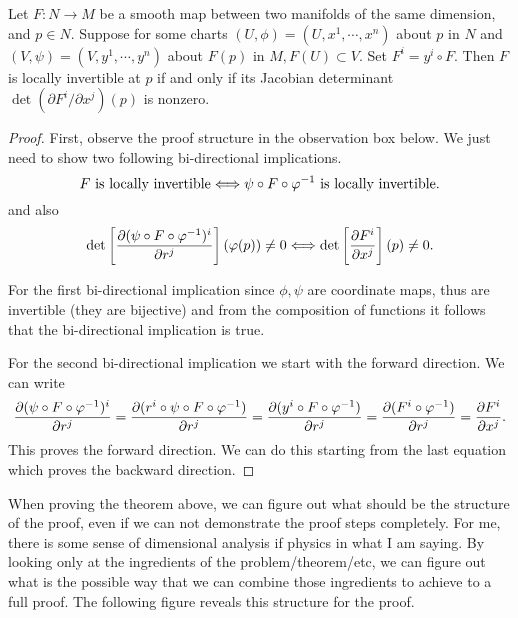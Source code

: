 \begin{definition}
	Let $ F: N \to M $ be a smooth map between two manifolds of the same dimension, and $ p \in N $. Suppose for some charts $ (U,\phi) = (U,x^1,\cdots,x^n) $ about $ p $ in $ N $ and $ (V,\psi) = (V,y^1,\cdots,y^n)$ about $ F(p) $ in $ M, F(U) \subset V $. Set $ F^i = y^i \circ F $. Then $ F $ is locally invertible at $ p $ if and only if its Jacobian determinant $ \det(\partial F^i/\partial x^j)(p) $ is nonzero.
\end{definition}
\begin{proof}
	First, observe the proof structure in the observation box below. We just need to show two following bi-directional implications.
	\[ F \text{ is locally invertible} \Longleftrightarrow \psi\circ F \circ \varphi^{-1} \text{ is locally invertible.} \]
	and also
	\[ \det \left[ \frac{\partial (\psi\circ F \circ \varphi^{-1})^i}{\partial r^j}  \right](\varphi(p)) \neq 0 \Longleftrightarrow \det\left[ \frac{\partial F^i}{\partial x^j} \right](p) \neq 0. \]
	
	For the first bi-directional implication since $ \phi,\psi $ are coordinate maps, thus are invertible (they are bijective) and from the composition of functions it follows that the bi-directional implication is true.
	
	For the second bi-directional implication we start with the forward direction. We can write
	\[ \frac{\partial (\psi\circ F \circ \varphi^{-1})^i}{\partial r^j} = \frac{\partial (r^i \circ \psi \circ F \circ \varphi^{-1})}{\partial r^j} = \frac{\partial(y^i\circ F\circ \varphi^{-1})}{\partial r^j} = \frac{\partial( F^i \circ \varphi^{-1})}{\partial r^j} =  \frac{\partial F^i}{\partial x^j}. \]
	This proves the forward direction. We can do this starting from the last equation which proves the backward direction.
\end{proof}

\begin{observation}
	When proving the theorem above, we can figure out what should be the structure of the proof, even if we can not demonstrate the proof steps completely. For me, there is some sense of dimensional analysis if physics in what I am saying. By looking only at the ingredients of the problem/theorem/etc, we can figure out what is the possible way that we can combine those ingredients to achieve to a full proof. The following figure reveals this structure for the proof.
\end{observation}
	
	
